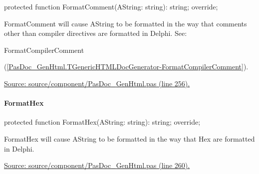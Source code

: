 \documentclass{report}
\newif\ifpdf
\begin{document}
\label{PasDoc_GenHtml.TGenericHTMLDocGenerator-FormatComment}
\begin{list}{}{
\setlength{\itemindent}{0cm}
\setlength{\listparindent}{0cm}
\setlength{\leftmargin}{\evensidemargin}
\addtolength{\leftmargin}{\tmplength}
\settowidth{\labelsep}{X}
\addtolength{\leftmargin}{\labelsep}
\setlength{\labelwidth}{\tmplength}
}
\item[\textbf{Declaration}\hfill]
\ifpdf
\begin{flushleft}
\fi
\begin{ttfamily}
protected function FormatComment(AString: string): string; override;\end{ttfamily}

\ifpdf
\end{flushleft}
\fi

\par
\item[\textbf{Description}]
FormatComment will cause AString to be formatted in the way that comments other than compiler directives are formatted in Delphi. See: \begin{ttfamily}FormatCompilerComment\end{ttfamily}(\ref{PasDoc_GenHtml.TGenericHTMLDocGenerator-FormatCompilerComment}).\par
\href{https://github.com/pasdoc/pasdoc/blob/master/source/component/PasDoc_GenHtml.pas#L256}{Source: source/component/PasDoc{\_}GenHtml.pas (line 256).}

\end{list}
\paragraph*{FormatHex}\hspace*{\fill}

\label{PasDoc_GenHtml.TGenericHTMLDocGenerator-FormatHex}
\begin{list}{}{
\setlength{\itemindent}{0cm}
\setlength{\listparindent}{0cm}
\setlength{\leftmargin}{\evensidemargin}
\addtolength{\leftmargin}{\tmplength}
\settowidth{\labelsep}{X}
\addtolength{\leftmargin}{\labelsep}
\setlength{\labelwidth}{\tmplength}
}
\item[\textbf{Declaration}\hfill]
\ifpdf
\begin{flushleft}
\fi
\begin{ttfamily}
protected function FormatHex(AString: string): string; override;\end{ttfamily}

\ifpdf
\end{flushleft}
\fi

\par
\item[\textbf{Description}]
FormatHex will cause AString to be formatted in the way that Hex are formatted in Delphi.\par
\href{https://github.com/pasdoc/pasdoc/blob/master/source/component/PasDoc_GenHtml.pas#L260}{Source: source/component/PasDoc{\_}GenHtml.pas (line 260).}

\end{list}
\end{document}
